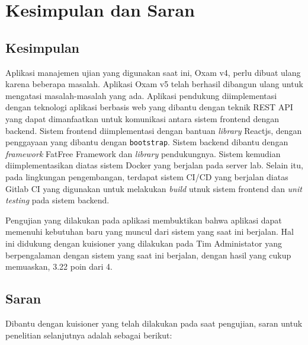 \chapter{Kesimpulan dan Saran}
\label{chap:kesimpulan-saran}

\section{Kesimpulan}
    Aplikasi manajemen ujian yang digunakan saat ini, Oxam v4, perlu dibuat ulang karena beberapa masalah. 
    Aplikasi Oxam v5 telah berhasil dibangun ulang untuk mengatasi masalah-masalah yang ada.
    Aplikasi pendukung diimplementasi dengan teknologi aplikasi berbasis web yang dibantu dengan teknik REST API
    yang dapat dimanfaatkan untuk komunikasi antara sistem frontend dengan backend. Sistem frontend diimplementasi
    dengan bantuan \textit{library} Reactjs, dengan penggayaan yang dibantu dengan \texttt{bootstrap}. Sistem
    backend dibantu dengan \textit{framework} FatFree Framework dan \textit{library} pendukungnya. Sistem
    kemudian diimplementasikan diatas sistem Docker yang berjalan pada server lab. Selain itu, pada lingkungan
    pengembangan, terdapat sistem CI/CD yang berjalan diatas Gitlab CI yang digunakan untuk melakukan
    \textit{build} utnuk sistem frontend dan \textit{unit testing} pada sistem backend.
    
    Pengujian yang dilakukan pada aplikasi membuktikan  bahwa aplikasi dapat memenuhi kebutuhan baru yang muncul
    dari sistem yang saat ini berjalan. Hal ini didukung dengan kuisioner yang dilakukan pada Tim Administator
    yang berpengalaman dengan sistem yang saat ini berjalan, dengan hasil yang cukup memuaskan, 3.22 poin dari 4.
    
\section{Saran}
    Dibantu dengan kuisioner yang telah dilakukan pada saat pengujian, saran untuk penelitian selanjutnya adalah
    sebagai berikut:
    \begin{enumerate}

    \end{enumerate}